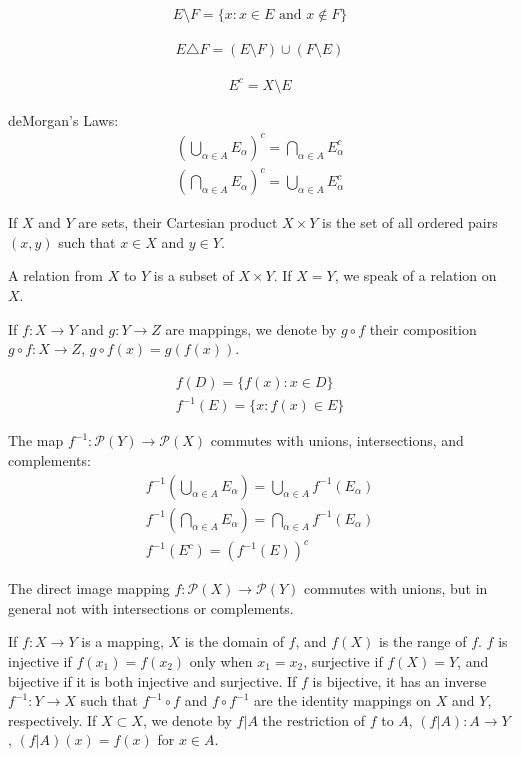 \begin{align}
    E \setminus F = \{ x : x \in E \text{ and } x \notin F \}
\end{align}

\begin{align}
    E \triangle F = (E \setminus F) \cup (F \setminus E)
\end{align}

\begin{align}
    E^c = X \setminus E
\end{align}

deMorgan's Laws:
\begin{align}
    (\bigcup_{\alpha \in A} E_{\alpha})^{c} = \bigcap_{\alpha \in A} E_{\alpha}^{c} \\
    (\bigcap_{\alpha \in A} E_{\alpha})^{c} = \bigcup_{\alpha \in A} E_{\alpha}^{c}
\end{align}

If $X$ and $Y$ are sets, their Cartesian product $X \times Y$ is the set of all ordered pairs $(x, y)$ such that $x \in X$ and $y \in Y$.

A relation from $X$ to $Y$ is a subset of $X \times Y$.
If $X=Y$, we speak of a relation on $X$.

If $f: X \to Y$ and $g: Y \to Z$ are mappings, we denote by $g \circ f$ their composition $g \circ f: X \to Z$, $g \circ f (x) = g(f(x))$.

\begin{align}
    f(D) = \{ f(x) : x \in D \} \\
    f^{-1}(E) = \{ x : f(x) \in E \}
\end{align}

The map $f^{-1}: \mathcal{P}(Y) \to \mathcal{P}(X)$ commutes with unions, intersections, and complements:
\begin{align}
    f^{-1} (\bigcup_{\alpha \in A} E_{\alpha}) = \bigcup_{\alpha \in A} f^{-1}(E_{\alpha}) \\
    f^{-1} (\bigcap_{\alpha \in A} E_{\alpha}) = \bigcap_{\alpha \in A} f^{-1}(E_{\alpha}) \\
    f^{-1} (E^{c}) = (f^{-1}(E))^{c}
\end{align}

The direct image mapping $f: \mathcal{P}(X) \to \mathcal{P}(Y)$ commutes with unions, but in general not with intersections or complements.

If $f: X \to Y$ is a mapping, $X$ is the domain of $f$, and $f(X)$ is the range of $f$.
$f$ is injective if $f(x_1) = f(x_2)$ only when $x_1 = x_2$, surjective if $f(X) = Y$, and bijective if it is both injective and surjective.
If $f$ is bijective, it has an inverse $f^{-1}: Y \to X$ such that $f^{-1} \circ f$ and $f \circ f^{-1}$ are the identity mappings on $X$ and $Y$, respectively.
If $X \subset X$, we denote by $f|A$ the restriction of $f$ to $A$, $(f|A): A \to Y$, $(f|A)(x) = f(x)$ for $x \in A$.

